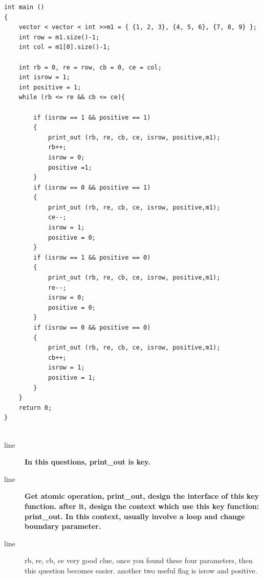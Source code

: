 \documentclass[a4paper,12pt,twoside]{book}
\begin{document}
\begin{itemize}
\begin{lstlisting}[numbers=none]
int main ()
{
	vector < vector < int >>m1 = { {1, 2, 3}, {4, 5, 6}, {7, 8, 9} };
	int row = m1.size()-1;
	int col = m1[0].size()-1;
	
	int rb = 0, re = row, cb = 0, ce = col;
	int isrow = 1;
	int positive = 1;
	while (rb <= re && cb <= ce){
		
		if (isrow == 1 && positive == 1)
		{
			print_out (rb, re, cb, ce, isrow, positive,m1);
			rb++;
			isrow = 0;
			positive =1;
		}
		if (isrow == 0 && positive == 1)
		{
			print_out (rb, re, cb, ce, isrow, positive,m1);
			ce--;
			isrow = 1;
			positive = 0;
		}
		if (isrow == 1 && positive == 0)
		{
			print_out (rb, re, cb, ce, isrow, positive,m1);
			re--;
			isrow = 0;
			positive = 0;
		}
		if (isrow == 0 && positive == 0)
		{
			print_out (rb, re, cb, ce, isrow, positive,m1);
			cb++;
			isrow = 1;
			positive = 1;
		}
	}
	return 0;
}	
	
\end{lstlisting}		
	
\begin{description}
	\item[line ] \textbf{In this questions, print\_out is key. }
	\item[line ] \textbf{Get atomic operation, print\_out, design the interface of this key function. after it, design the context which use this key function: print\_out. In this context, usually involve a loop and change boundary parameter.}
	
	\item[line ] rb, re, cb, ce very good clue, once you found these four parameters, then this question becomes easier. another two useful flag is isrow and positive. 
\end{description}


\end{itemize}



\ifx \allfiles \undefined
\end{document}
